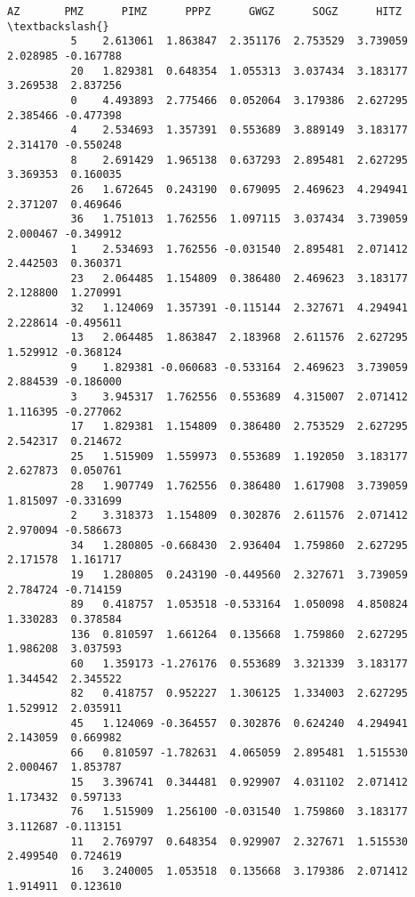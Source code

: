 \documentclass[11pt]{article}
\begin{document}
\begin{Verbatim}[commandchars=\\\{\}]
                     AZ       PMZ      PIMZ      PPPZ      GWGZ      SOGZ      HITZ  \textbackslash{}
          5    2.613061  1.863847  2.351176  2.753529  3.739059  2.028985 -0.167788   
          20   1.829381  0.648354  1.055313  3.037434  3.183177  3.269538  2.837256   
          0    4.493893  2.775466  0.052064  3.179386  2.627295  2.385466 -0.477398   
          4    2.534693  1.357391  0.553689  3.889149  3.183177  2.314170 -0.550248   
          8    2.691429  1.965138  0.637293  2.895481  2.627295  3.369353  0.160035   
          26   1.672645  0.243190  0.679095  2.469623  4.294941  2.371207  0.469646   
          36   1.751013  1.762556  1.097115  3.037434  3.739059  2.000467 -0.349912   
          1    2.534693  1.762556 -0.031540  2.895481  2.071412  2.442503  0.360371   
          23   2.064485  1.154809  0.386480  2.469623  3.183177  2.128800  1.270991   
          32   1.124069  1.357391 -0.115144  2.327671  4.294941  2.228614 -0.495611   
          13   2.064485  1.863847  2.183968  2.611576  2.627295  1.529912 -0.368124   
          9    1.829381 -0.060683 -0.533164  2.469623  3.739059  2.884539 -0.186000   
          3    3.945317  1.762556  0.553689  4.315007  2.071412  1.116395 -0.277062   
          17   1.829381  1.154809  0.386480  2.753529  2.627295  2.542317  0.214672   
          25   1.515909  1.559973  0.553689  1.192050  3.183177  2.627873  0.050761   
          28   1.907749  1.762556  0.386480  1.617908  3.739059  1.815097 -0.331699   
          2    3.318373  1.154809  0.302876  2.611576  2.071412  2.970094 -0.586673   
          34   1.280805 -0.668430  2.936404  1.759860  2.627295  2.171578  1.161717   
          19   1.280805  0.243190 -0.449560  2.327671  3.739059  2.784724 -0.714159   
          89   0.418757  1.053518 -0.533164  1.050098  4.850824  1.330283  0.378584   
          136  0.810597  1.661264  0.135668  1.759860  2.627295  1.986208  3.037593   
          60   1.359173 -1.276176  0.553689  3.321339  3.183177  1.344542  2.345522   
          82   0.418757  0.952227  1.306125  1.334003  2.627295  1.529912  2.035911   
          45   1.124069 -0.364557  0.302876  0.624240  4.294941  2.143059  0.669982   
          66   0.810597 -1.782631  4.065059  2.895481  1.515530  2.000467  1.853787   
          15   3.396741  0.344481  0.929907  4.031102  2.071412  1.173432  0.597133   
          76   1.515909  1.256100 -0.031540  1.759860  3.183177  3.112687 -0.113151   
          11   2.769797  0.648354  0.929907  2.327671  1.515530  2.499540  0.724619   
          16   3.240005  1.053518  0.135668  3.179386  2.071412  1.914911  0.123610   

\end{Verbatim}
\end{document}
